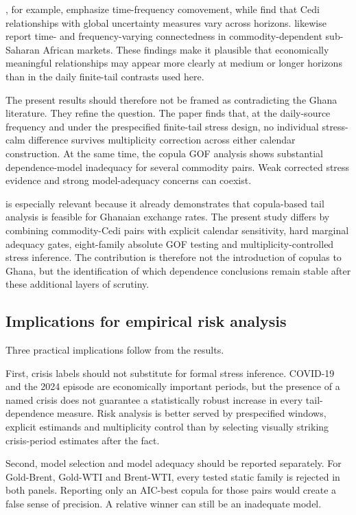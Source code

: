 \citet{barson2023}, for example, emphasize time-frequency comovement, while \citet{atipaga2025} find that Cedi relationships with global uncertainty measures vary across horizons. \citet{woode2025} likewise report time- and frequency-varying connectedness in commodity-dependent sub-Saharan African markets. These findings make it plausible that economically meaningful relationships may appear more clearly at medium or longer horizons than in the daily finite-tail contrasts used here.

The present results should therefore not be framed as contradicting the Ghana literature. They refine the question. The paper finds that, at the daily-source frequency and under the prespecified finite-tail stress design, no individual stress-calm difference survives multiplicity correction across either calendar construction. At the same time, the copula GOF analysis shows substantial dependence-model inadequacy for several commodity pairs. Weak corrected stress evidence and strong model-adequacy concerns can coexist.

\citet{mensah2020} is especially relevant because it already demonstrates that copula-based tail analysis is feasible for Ghanaian exchange rates. The present study differs by combining commodity-Cedi pairs with explicit calendar sensitivity, hard marginal adequacy gates, eight-family absolute GOF testing and multiplicity-controlled stress inference. The contribution is therefore not the introduction of copulas to Ghana, but the identification of which dependence conclusions remain stable after these additional layers of scrutiny.

\subsection{Implications for empirical risk analysis}

Three practical implications follow from the results.

First, crisis labels should not substitute for formal stress inference. COVID-19 and the 2024 episode are economically important periods, but the presence of a named crisis does not guarantee a statistically robust increase in every tail-dependence measure. Risk analysis is better served by prespecified windows, explicit estimands and multiplicity control than by selecting visually striking crisis-period estimates after the fact.

Second, model selection and model adequacy should be reported separately. For Gold-Brent, Gold-WTI and Brent-WTI, every tested static family is rejected in both panels. Reporting only an AIC-best copula for those pairs would create a false sense of precision. A relative winner can still be an inadequate model.

